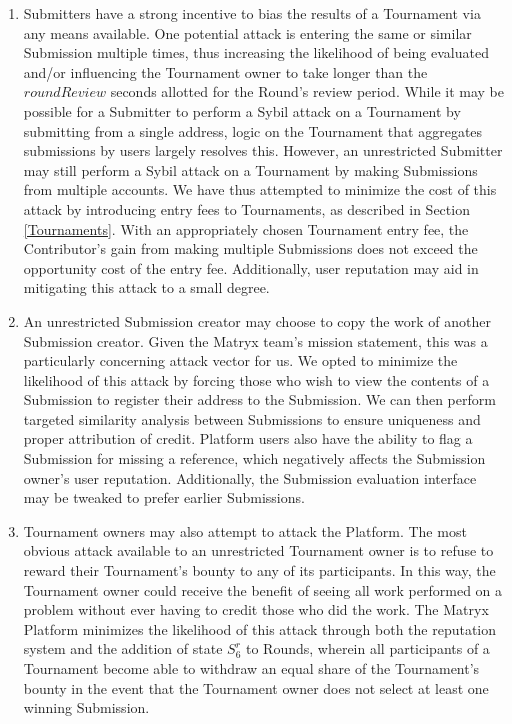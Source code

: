 \documentclass[a4paper, 10pt, conference]{ieeeconf}      %
\begin{document}
\begin{enumerate}
    \item  Submitters have a strong incentive to bias the results of a Tournament via any means available. 
One potential attack is entering the same or similar Submission multiple times, thus increasing the likelihood of being evaluated and/or influencing the Tournament owner to take longer than the $roundReview$ seconds allotted for the Round's review period. While it may be possible for a Submitter to perform a Sybil attack on a Tournament by submitting from a single address, logic on the Tournament that aggregates submissions by users largely resolves this. However, an unrestricted Submitter may still perform a Sybil attack on a Tournament by making Submissions from multiple accounts. We have thus attempted to minimize the cost of this attack by introducing entry fees to Tournaments, as described in Section \ref{Tournaments}. With an appropriately chosen Tournament entry fee, the Contributor’s gain from making multiple Submissions does not exceed the opportunity cost of the entry fee. Additionally, user reputation may aid in mitigating this attack to a small degree.
\item An unrestricted Submission creator may choose to copy the work of another Submission creator. Given the Matryx team's mission statement, this was a particularly concerning attack vector for us. We opted to minimize the likelihood of this attack by forcing those who wish to view the contents of a Submission to register their address to the Submission. We can then perform targeted similarity analysis between Submissions to ensure uniqueness and proper attribution of credit. Platform users also have the ability to flag a Submission for missing a reference, which negatively affects the Submission owner's user reputation. Additionally, the Submission evaluation interface may be tweaked to prefer earlier Submissions.
\item Tournament owners may also attempt to attack the Platform. The most obvious attack available to an unrestricted Tournament owner is to refuse to reward their Tournament's bounty to any of its participants. In this way, the Tournament owner could receive the benefit of seeing all work performed on a problem without ever having to credit those who did the work.
The Matryx Platform minimizes the likelihood of this attack through both the reputation system and the addition of state $S_{6}^r$ to Rounds, wherein all participants of a Tournament become able to withdraw an equal share of the Tournament's bounty in the event that the Tournament owner does not select at least one winning Submission.


\end{enumerate}
\end{document}
